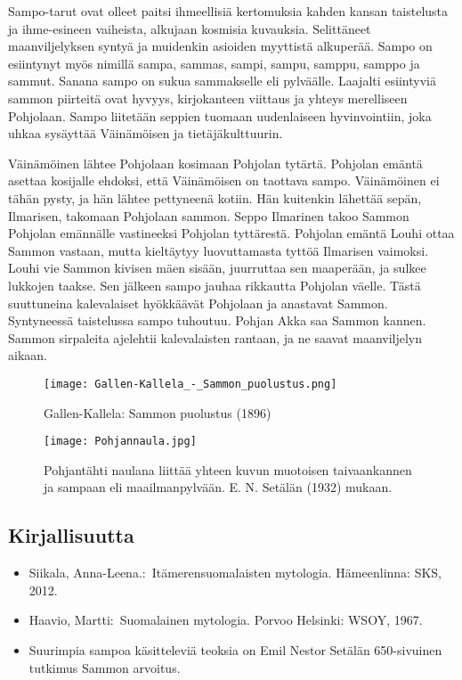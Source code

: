   Sampo-tarut ovat olleet paitsi ihmeellisiä kertomuksia kahden kansan taistelusta ja 
  ihme-esineen vaiheista, alkujaan kosmisia kuvauksia. Selittäneet maanviljelyksen syntyä ja 
  muidenkin asioiden myyttistä alkuperää. Sampo on esiintynyt myös nimillä sampa, sammas, sampi, 
  sampu, samppu, samppo ja sammut. Sanana sampo on sukua sammakselle eli pylväälle. Laajalti 
  esiintyviä sammon piirteitä ovat hyvyys, kirjokanteen viittaus ja yhteys merelliseen Pohjolaan. 
  Sampo liitetään seppien tuomaan uudenlaiseen hyvinvointiin, joka uhkaa sysäyttää Väinämöisen 
  ja tietäjäkulttuurin.

  Väinämöinen lähtee Pohjolaan kosimaan Pohjolan tytärtä. Pohjolan emäntä a\-settaa kosijalle 
  ehdoksi, että Väinämöisen on taottava sampo. Väinämöinen ei tähän pysty, ja hän lähtee 
  pettyneenä kotiin. Hän kuitenkin lähettää sepän, Ilmarisen, takomaan Pohjolaan sammon. Seppo 
  Ilmarinen takoo Sammon Pohjolan emännälle vastineeksi Pohjolan tyttärestä. Pohjolan emäntä 
  Louhi ottaa Sammon vastaan, mutta kieltäytyy luovuttamasta tyttöä Ilmarisen vaimoksi. Louhi vie 
  Sammon kivisen mäen sisään, juurruttaa sen maaperään, ja sulkee lukkojen taakse. Sen jälkeen 
  sampo jauhaa rikkautta Pohjolan väelle. Tästä suuttuneina kalevalaiset hyökkäävät Pohjolaan ja 
  anastavat Sammon. Syntyneessä taistelussa sampo tuhoutuu. Pohjan Akka saa Sammon kannen. Sammon 
  sirpaleita ajelehtii kalevalaisten rantaan, ja ne saavat maanviljelyn aikaan.
 
 
  \begin{figure}[!hb]
    \caption{Gallen-Kallela: Sammon puolustus (1896)}
    \centering
    \texttt{[image: Gallen-Kallela\_-\_Sammon\_puolustus.png]}
  \end{figure}  

  \begin{figure}[!hb]
    \caption{Pohjantähti naulana liittää yhteen kuvun muotoisen taivaankannen ja sampaan eli maailmanpylvään. E. N. Setälän (1932) mukaan.}
    \centering
    \texttt{[image: Pohjannaula.jpg]}
  \end{figure}  
  
  
  
\subsection{Kirjallisuutta}

  \begin{itemize}
    \item Siikala, Anna-Leena.: Itämerensuomalaisten mytologia. Hämeenlinna: SKS, 2012. 
    \item Haavio, Martti: Suomalainen mytologia. Porvoo Helsinki: WSOY, 1967. 
    \item Suurimpia sampoa käsitteleviä teoksia on Emil Nestor Setälän 650-sivuinen tutkimus Sammon arvoitus.
  \end{itemize}

